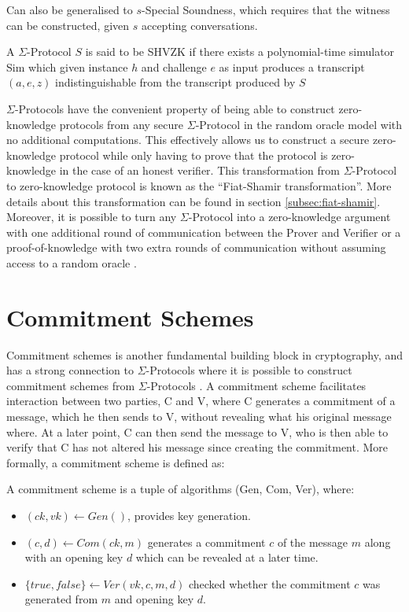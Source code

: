 Can also be generalised to $s$-Special Soundness, which requires that the
witness can be constructed, given $s$ accepting conversations.

\begin{definition}[SHVZK]
  A $\Sigma$-Protocol $S$ is said to be SHVZK if there exists a polynomial-time
  simulator Sim which given instance $h$ and challenge $e$ as input produces a
  transcript $(a,e,z)$ indistinguishable from the transcript produced by $S$
\end{definition}

$\Sigma$-Protocols have the convenient property of being able to construct
zero-knowledge protocols from any secure $\Sigma$-Protocol in the random oracle
model with no additional computations. This effectively allows us to construct a
secure zero-knowledge protocol while only having to prove that the protocol is
zero-knowledge in the case of an honest verifier. This transformation from
$\Sigma$-Protocol to zero-knowledge protocol is known as the ``Fiat-Shamir
transformation''. More details about this transformation can be found in section
\ref{subsec:fiat-shamir}.
Moreover, it is possible to turn any $\Sigma$-Protocol into a zero-knowledge
argument with one additional round of communication between the Prover and
Verifier or a proof-of-knowledge with two extra rounds of communication without
assuming access to a random oracle \cite{on-sigma-protocols}.


\section{Commitment Schemes}
\label{sec:background:commitment}
Commitment schemes is another fundamental building block in cryptography, and
has a strong connection to $\Sigma$-Protocols where it is possible to construct
commitment schemes from $\Sigma$-Protocols \cite{cryptoeprint:2019:1185}. A commitment
scheme facilitates interaction between two parties, C and V, where C
generates a commitment of a message, which he then sends to V, without revealing
what his original message where. At a later point, C can then send the message
to V, who is then able to verify that C has not altered his message since
creating the commitment. More formally, a commitment scheme is defined as:

\begin{definition}
A commitment scheme is a tuple of algorithms (Gen, Com, Ver), where:
\begin{itemize}
  \item $(ck, vk) \leftarrow Gen()$, provides key generation.
  \item $(c, d) \leftarrow Com(ck, m)$ generates a commitment $c$ of the message
    $m$ along with an opening key $d$ which can be revealed at a later time.
  \item $\{true, false\} \leftarrow Ver(vk, c, m, d)$ checked whether the
    commitment $c$ was generated from $m$ and opening key $d$.
\end{itemize}
\end{definition}

